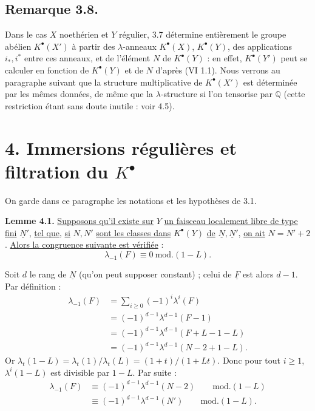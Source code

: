
\subsection*{Remarque 3.8.}

Dans le cas \(X\) noethérien et \(Y\) régulier, 3.7 détermine entièrement le groupe abélien \(K^{\bullet}(X')\) à partir des \(\lambda\)-anneaux \(K^{\bullet}(X)\), \(K^{\bullet}(Y)\), des applications \(i_*,i^*\) entre ces anneaux, et de l'élément \(N\) de \(K^{\bullet}(Y)\) : en effet, \(K^{\bullet}(Y')\) peut se calculer en fonction de \(K^{\bullet}(Y)\) et de \(N\) d'après (VI 1.1). Nous verrons au paragraphe suivant que la structure multiplicative de \(K^{\bullet}(X')\) est déterminée par les mêmes données, de même que la \(\lambda\)-structure si l'on tensorise par \(\mathbb Q\) (cette restriction étant sans doute inutile : voir 4.5).

\section*{4. Immersions régulières et filtration du \(K^{\bullet}\)}

On garde dans ce paragraphe les notations et les hypothèses de 3.1.

\textbf{Lemme 4.1.} \uline{Supposons qu'il existe sur} \(Y\) \uline{un faisceau localement libre de type fini} \(\underline{N}'\), \uline{tel que}, \uline{si} \(N,N'\) \uline{sont les classes dans} \(K^{\bullet}(Y)\) \uline{de} \(\underline{N},\underline{N}'\), \uline{on ait} \(N=N'+2\). \uline{Alors la congruence suivante est vérifiée} :
\[
  \lambda_{-1}(F)\equiv 0 \ \mathrm{mod.}(1-L).
\]

Soit \(d\) le rang de \(\underline{N}\) (qu'on peut supposer constant) ; celui de \(\underline{F}\) est alors \(d-1\). Par définition :
\[
\begin{aligned}
\lambda_{-1}(F)
 &= \sum_{i\ge0}(-1)^i\lambda^i(F)\\
 &= (-1)^{d-1}\lambda^{d-1}(F-1)\\
 &= (-1)^{d-1}\lambda^{d-1}(F+L-1-L)\\
 &= (-1)^{d-1}\lambda^{d-1}(N-2+1-L).
\end{aligned}
\]
Or \(\lambda_t(1-L)=\lambda_t(1)/\lambda_t(L)=(1+t)/(1+Lt)\). Donc pour tout \(i\ge1\), \(\lambda^i(1-L)\) est divisible par \(1-L\). Par suite :
\[
\begin{aligned}
\lambda_{-1}(F)
  &\equiv (-1)^{d-1}\lambda^{d-1}(N-2) \qquad\mathrm{mod.}(1-L)\\
  &\equiv(-1)^{d-1}\lambda^{d-1}(N') \qquad\mathrm{mod.}(1-L).
\end{aligned}
\]
